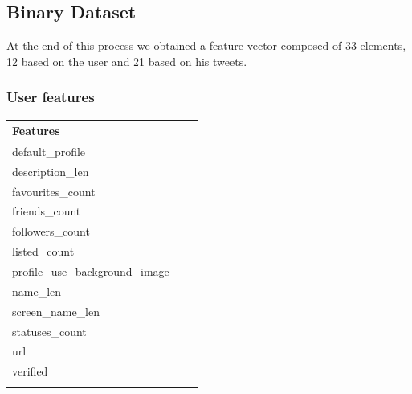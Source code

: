 \subsection{Binary Dataset}
At the end of this process we obtained a feature vector composed of 33 elements, 12 based on the user and 21 based on his tweets.

\subsubsection{User features}


\small
\begin{center}
	\begin{tabular}{lll}
		\textbf{Features}\\
		\hline\hline
		default\_profile\\
		description\_len\\
		favourites\_count\\
		friends\_count\\
		followers\_count\\
		listed\_count\\
		profile\_use\_background\_image\\
		name\_len\\
		screen\_name\_len\\
		statuses\_count\\
		url\\
		verified\\
		\hline\\
		
	\end{tabular}
\end{center}
\normalsize

